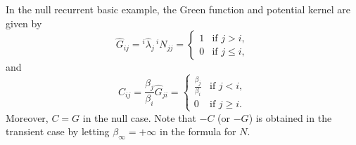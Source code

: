 In the null recurrent basic example, the Green function and potential kernel are given by
$$\hat{G}_{ij} = {^i\hat{\lambda}_j} \, {^i N_{jj}} = \begin{cases} 1 & \text{if } j > i, \\ 0 & \text{if } j \leq i, \end{cases}$$
and
$$C_{ij} = \frac{\beta_j}{\beta_i} \hat{G}_{ji} = \begin{cases} \frac{\beta_j}{\beta_i} & \text{if } j < i, \\ 0 & \text{if } j \geq i. \end{cases}$$
Moreover, $C = G$ in the null case. Note that $-C$ (or $-G$) is obtained in the transient case by letting $\beta_\infty = +\infty$ in the formula for $N$.
